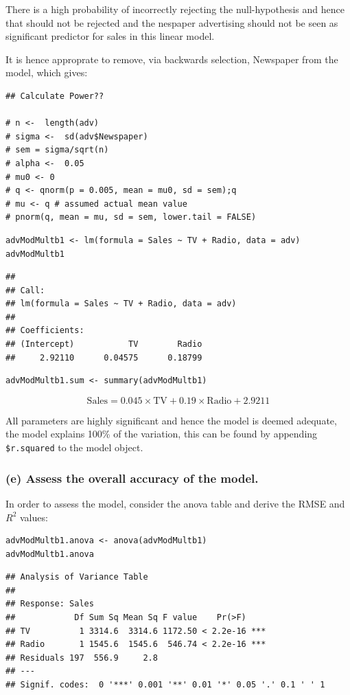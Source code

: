 \documentclass[11pt]{article}
\begin{document}
There is a high probability of incorrectly rejecting the null-hypothesis
and hence that should not be rejected and the nespaper advertising
should not be seen as significant predictor for sales in this linear
model.

It is hence approprate to remove, via backwards selection, Newspaper
from the model, which gives:

\begin{verbatim}
## Calculate Power??

# n <-  length(adv)
# sigma <-  sd(adv$Newspaper)
# sem = sigma/sqrt(n)
# alpha <-  0.05
# mu0 <- 0
# q <- qnorm(p = 0.005, mean = mu0, sd = sem);q
# mu <- q # assumed actual mean value
# pnorm(q, mean = mu, sd = sem, lower.tail = FALSE)
\end{verbatim}

\begin{verbatim}
advModMultb1 <- lm(formula = Sales ~ TV + Radio, data = adv)
advModMultb1
\end{verbatim}

\begin{verbatim}
## 
## Call:
## lm(formula = Sales ~ TV + Radio, data = adv)
## 
## Coefficients:
## (Intercept)           TV        Radio  
##     2.92110      0.04575      0.18799
\end{verbatim}

\begin{verbatim}
advModMultb1.sum <- summary(advModMultb1)
\end{verbatim}

$$
  \text{Sales} = 0.045 \times \text{TV} + 0.19 \times \text{Radio} + 2.9211
  $$

All parameters are highly significant and hence the model is deemed
adequate, the model explains 100\% of the variation, this can be found by
appending \texttt{\$r.squared} to the model object.

\subsubsection{(e) Assess the overall accuracy of the model.}
\label{sec:org1022a71}
In order to assess the model, consider the anova table and derive the
RMSE and \(R^2\) values:

\begin{verbatim}
advModMultb1.anova <- anova(advModMultb1)
advModMultb1.anova
\end{verbatim}

\begin{verbatim}
## Analysis of Variance Table
## 
## Response: Sales
##            Df Sum Sq Mean Sq F value    Pr(>F)    
## TV          1 3314.6  3314.6 1172.50 < 2.2e-16 ***
## Radio       1 1545.6  1545.6  546.74 < 2.2e-16 ***
## Residuals 197  556.9     2.8                      
## ---
## Signif. codes:  0 '***' 0.001 '**' 0.01 '*' 0.05 '.' 0.1 ' ' 1
\end{verbatim}
\end{document}
